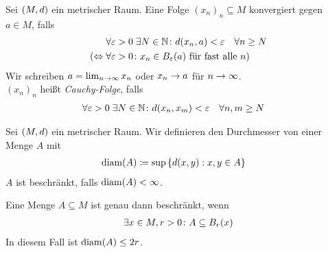\thispagestyle{pagenumberonly}

\begin{definition}
    Sei $\left(M, d\right)$ ein metrischer Raum. Eine Folge $(x_n)_n \subseteq M$ konvergiert gegen $a \in M$, falls
    \begin{align*}
        &\forall\varepsilon > 0\ex N\in\N\colon d\of{x_n, a} < \varepsilon\quad\forall n\geq N\\
        (\equivalent &\forall \varepsilon > 0\colon x_n \in B_{\varepsilon}\of{a} \text{ für fast alle } n)
    \end{align*}
    Wir schreiben $a = \lim_{n\rightarrow{}\infty} x_n$ oder $x_n\rightarrow{} a$ für $n\rightarrow{}\infty$.\\
    $(x_n)_n$ heißt \emph{Cauchy-Folge}, falls
    \begin{align*}
        &\forall\varepsilon>0\ex N\in\N\colon d\of{x_n, x_m} < \varepsilon\quad\forall n,m\geq N
    \end{align*}
\end{definition}

\begin{definition}[Durchmesser]
    Sei $\left(M, d\right)$ ein metrischer Raum. Wir definieren den Durchmesser von einer Menge $A$ mit
    \begin{align*}
        \diam\of{A} &\coloneqq \sup \set{d\of{x,y}: x,y\in A}
    \end{align*}
    $A$ ist beschränkt, falls $\diam\of{A} < \infty$.
\end{definition}

\begin{bemerkung}
    Eine Menge $A\subseteq M$ ist genau dann beschränkt, wenn
    \begin{align*}
        \exists x\in M, r> 0\colon A \subseteq B_r\of{x}
    \end{align*}
    In diesem Fall ist $\diam\of{A} \leq 2r$.
\end{bemerkung}

